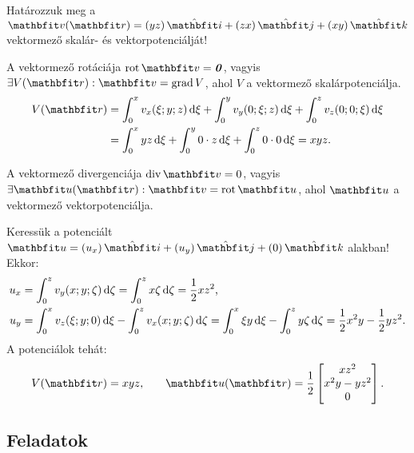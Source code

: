 \documentclass{szb-practice}
\begin{document}
\begin{example}[][nobreak]
  Határozzuk meg a $\rvec v(\coordvec) = \ijk{yz}{zx}{xy}$ vektormező skalár- és
  vektorpotenciálját!

  \boxrule%

  A vektormező rotáciája $\rot \rvec v = \nvec$, vagyis
  $\exists V(\coordvec): \rvec v = \grad V$,
  ahol $V$ a vektormező skalárpotenciálja.
  \begin{align*}
    V(\coordvec)
     & = \int_0^x v_x(\xi; y; z) \dd \xi
    + \int_0^y v_y(0; \xi; z) \dd \xi
    + \int_0^z v_z(0; 0; \xi) \dd \xi
    \\
     & = \int_0^x y z \dd \xi
    + \int_0^y 0 \cdot z \dd \xi
    + \int_0^z 0 \cdot 0 \dd \xi
    = x y z
    \text.
  \end{align*}

  A vektormező divergenciája $\Div \rvec v = 0$, vagyis
  $\exists \rvec u(\coordvec): \rvec v = \rot \rvec u$,
  ahol $\rvec u$ a vektormező vektorpotenciálja.

  Keressük a potenciált $\rvec u = \ijk{u_x}{u_y}{0}$ alakban! Ekkor:
  \begin{align*}
    u_x & = \int_0^z v_y(x; y; \zeta) \mathop{}\!\mathrm{d} \zeta
    = \int_0^z x \zeta \mathop{}\!\mathrm{d} \zeta
    = \frac{1}{2} x z^2
    \text,
    \\
    u_y & = \int_0^x v_z(\xi; y; 0) \mathop{}\!\mathrm{d} \xi
    - \int_0^z v_x(x; y; \zeta) \mathop{}\!\mathrm{d} \zeta
    = \int_0^x \xi y \mathop{}\!\mathrm{d} \xi - \int_0^z y \zeta \mathop{}\!\mathrm{d} \zeta
    = \frac{1}{2} x^2 y - \frac{1}{2} y z^2
    \text.
  \end{align*}
  A potenciálok tehát:
  \vspace{-1.5em}
  $$
    V(\coordvec) = x y z
    \text,
    \qquad
    \rvec u(\coordvec) = \frac12\begin{bmatrix}
      x z^2         \\
      x^2 y - y z^2 \\
      0
    \end{bmatrix}
    \text.
  $$
\end{example}



\clearpage
\subsection{Feladatok}
\end{document}
